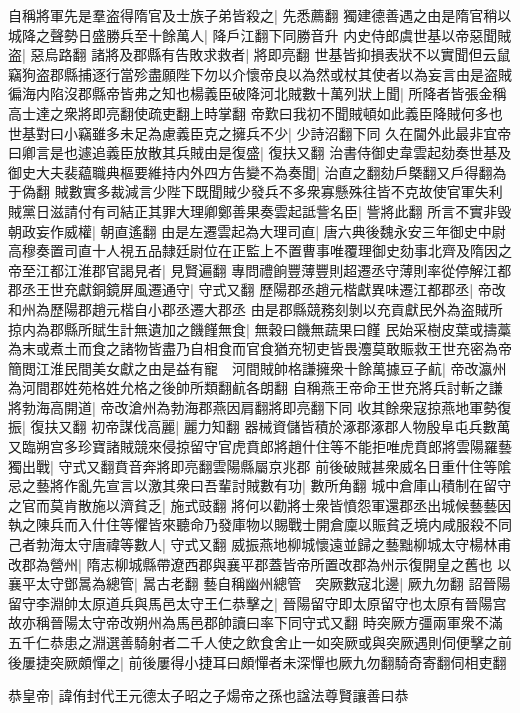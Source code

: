 自稱將軍先是羣盗得隋官及士族子弟皆殺之|{
	先悉薦翻}
獨建德善遇之由是隋官稍以城降之聲勢日盛勝兵至十餘萬人|{
	降戶江翻下同勝音升}
内史侍郎虞世基以帝惡聞賊盗|{
	惡烏路翻}
諸將及郡縣有告敗求救者|{
	將即亮翻}
世基皆抑損表狀不以實聞但云鼠竊狗盗郡縣捕逐行當殄盡願陛下勿以介懷帝良以為然或杖其使者以為妄言由是盗賊徧海内陷沒郡縣帝皆弗之知也楊義臣破降河北賊數十萬列狀上聞|{
	所降者皆張金稱高士達之衆將即亮翻使疏吏翻上時掌翻}
帝歎曰我初不聞賊頓如此義臣降賊何多也世基對曰小竊雖多未足為慮義臣克之擁兵不少|{
	少詩沼翻下同}
久在閫外此最非宜帝曰卿言是也遽追義臣放散其兵賊由是復盛|{
	復扶又翻}
治書侍御史韋雲起劾奏世基及御史大夫裴藴職典樞要維持内外四方告變不為奏聞|{
	治直之翻劾戶槩翻又戶得翻為于偽翻}
賊數實多裁減言少陛下既聞賊少發兵不多衆寡懸殊往皆不克故使官軍失利賊黨日滋請付有司結正其罪大理卿鄭善果奏雲起詆訾名臣|{
	訾將此翻}
所言不實非毁朝政妄作威權|{
	朝直遙翻}
由是左遷雲起為大理司直|{
	唐六典後魏永安三年御史中尉高穆奏置司直十人視五品隸廷尉位在正監上不置曹事唯覆理御史劾事北齊及隋因之}
帝至江都江淮郡官謁見者|{
	見賢遍翻}
專問禮餉豐薄豐則超遷丞守薄則率從停解江都郡丞王世充獻銅鏡屏風遷通守|{
	守式又翻}
歷陽郡丞趙元楷獻異味遷江都郡丞|{
	帝改和州為歷陽郡趙元楷自小郡丞遷大郡丞}
由是郡縣競務刻剝以充貢獻民外為盗賊所掠内為郡縣所賦生計無遺加之饑饉無食|{
	無穀曰饑無蔬果曰饉}
民始采樹皮葉或擣藁為末或煮土而食之諸物皆盡乃自相食而官食猶充牣吏皆畏灋莫敢賑救王世充密為帝簡閲江淮民間美女獻之由是益有寵　河間賊帥格謙擁衆十餘萬據豆子䴚|{
	帝改瀛州為河間郡姓苑格姓允格之後帥所類翻䴚各朗翻}
自稱燕王帝命王世充將兵討斬之謙將勃海高開道|{
	帝改滄州為勃海郡燕因肩翻將即亮翻下同}
收其餘衆寇掠燕地軍勢復振|{
	復扶又翻}
初帝謀伐高麗|{
	麗力知翻}
器械資儲皆積於涿郡涿郡人物殷阜屯兵數萬又臨朔宫多珍寶諸賊競來侵掠留守官虎賁郎將趙什住等不能拒唯虎賁郎將雲陽羅藝獨出戰|{
	守式又翻賁音奔將即亮翻雲陽縣屬京兆郡}
前後破賊甚衆威名日重什住等隂忌之藝將作亂先宣言以激其衆曰吾輩討賊數有功|{
	數所角翻}
城中倉庫山積制在留守之官而莫肯散施以濟貧乏|{
	施式豉翻}
將何以勸將士衆皆憤怨軍還郡丞出城候藝藝因執之陳兵而入什住等懼皆來聽命乃發庫物以賜戰士開倉廩以賑貧乏境内咸服殺不同己者勃海太守唐禕等數人|{
	守式又翻}
威振燕地柳城懷遠並歸之藝黜柳城太守楊林甫改郡為營州|{
	隋志柳城縣帶遼西郡與襄平郡蓋皆帝所置改郡為州示復開皇之舊也}
以襄平太守鄧暠為總管|{
	暠古老翻}
藝自稱幽州總管　突厥數寇北邊|{
	厥九勿翻}
詔晉陽留守李淵帥太原道兵與馬邑太守王仁恭擊之|{
	晉陽留守即太原留守也太原有晉陽宫故亦稱晉陽太守帝改朔州為馬邑郡帥讀曰率下同守式又翻}
時突厥方彊兩軍衆不滿五千仁恭患之淵選善騎射者二千人使之飲食舍止一如突厥或與突厥遇則伺便擊之前後屢捷突厥頗憚之|{
	前後屢得小捷耳曰頗憚者未深憚也厥九勿翻騎奇寄翻伺相吏翻}


恭皇帝|{
	諱侑封代王元德太子昭之子煬帝之孫也諡法尊賢讓善曰恭}



